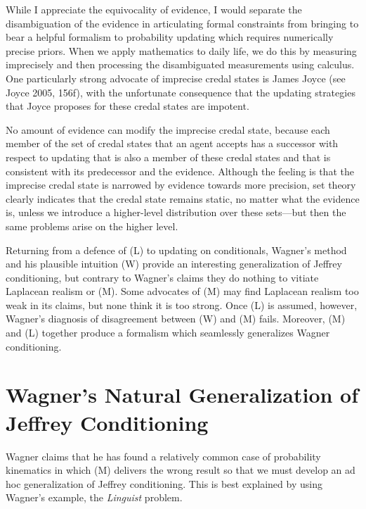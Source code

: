 \documentclass[12pt]{article}
\begin{document}
While I appreciate the equivocality of evidence, I would separate the
disambiguation of the evidence in articulating formal constraints from
bringing to bear a helpful formalism to probability updating which
requires numerically precise priors. When we apply mathematics to
daily life, we do this by measuring imprecisely and then processing
the disambiguated measurements using calculus. One particularly strong
advocate of imprecise credal states is James Joyce (see
Joyce 2005, 156f), with the unfortunate consequence that the
updating strategies that Joyce proposes for these credal states are
impotent. 

No amount of evidence can modify the imprecise credal state, because
each member of the set of credal states that an agent accepts has a
successor with respect to updating that is also a member of these
credal states and that is consistent with its predecessor and the
evidence. Although the feeling is that the imprecise credal state is
narrowed by evidence towards more precision, set theory clearly
indicates that the credal state remains static, no matter what the
evidence is, unless we introduce a higher-level distribution over
these sets---but then the same problems arise on the higher level.

Returning from a defence of (L) to updating on conditionals, Wagner's
method and his plausible intuition (W) provide an interesting
generalization of Jeffrey conditioning, but contrary to Wagner's
claims they do nothing to vitiate Laplacean realism or (M). Some
advocates of (M) may find Laplacean realism too weak in its claims,
but none think it is too strong. Once (L) is assumed, however,
Wagner's diagnosis of disagreement between (W) and (M) fails.
Moreover, (M) and (L) together produce a formalism which seamlessly
generalizes Wagner conditioning.

\section{Wagner's Natural Generalization of Jeffrey Conditioning}
\label{NatGen}

Wagner claims that he has found a relatively common case of
probability kinematics in which (M) delivers the wrong result so that
we must develop an ad hoc generalization of Jeffrey conditioning. This
is best explained by using Wagner's example, the \emph{Linguist}
problem.
\end{document}
